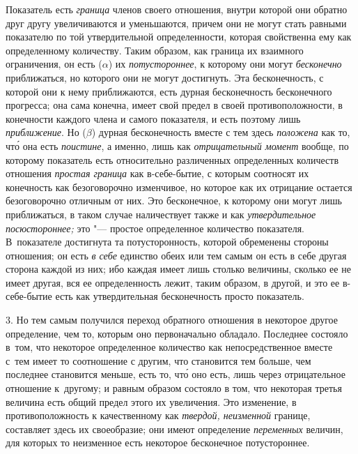 Показатель есть {\em граница} членов своего отношения, внутри которой они
обратно друг другу увеличиваются и уменьшаются, причем они не могут стать
равными показателю по той утвердительной определенности, которая свойственна
ему как определенному количеству. Таким образом, как граница их взаимного
ограничения, он есть ($\alpha$) их {\em потустороннее}, к которому они могут
{\em бесконечно} приближаться, но которого они не могут достигнуть. Эта
бесконечность, с которой они к нему приближаются, есть дурная бесконечность
бесконечного прогресса; она сама конечна, имеет свой предел в своей
противоположности, в конечности каждого члена и самого показателя, и есть
поэтому лишь {\em приближение}. Но ({\em $\beta$}) дурная бесконечность вместе
с тем здесь {\em положена} как то, чт\'{о} она есть {\em поистине}, а именно,
лишь как {\em отрицательный момент} вообще, по которому показатель есть
относительно различенных определенных количеств отношения {\em простая граница}
как в-себе-бытие, с которым соотносят их конечность как безоговорочно
изменчивое, но которое как их отрицание остается безоговорочно отличным от них.
Это бесконечное, к которому они могут лишь приближаться, в таком случае
наличествует также и как {\em утвердительное посюстороннее;} это "--- простое
определенное количество показателя. В~показателе достигнута та потусторонность,
которой обременены стороны отношения; он есть {\em в себе} единство обеих или
тем самым он есть в себе другая сторона каждой из них; ибо каждая имеет лишь
столько величины, сколько ее не имеет другая, вся ее определенность лежит,
таким образом, в другой, и это ее в-себе-бытие есть как утвердительная
бесконечность просто показатель.

3. Но тем самым получился переход обратного отношения в некоторое другое
определение, чем то, которым оно первоначально обладало. Последнее состояло
в~том, что некоторое определенное количество как непосредственное вместе с~тем
имеет то соотношение с другим, что становится тем больше, чем последнее
становится меньше, есть то, чт\'{о} оно есть, лишь через отрицательное
отношение к~другому; и равным образом состояло в том, что некоторая третья
величина есть общий предел этого их увеличения. Это изменение, в
противоположность к качественному как {\em твердой, неизменной} границе,
составляет здесь их своеобразие; они имеют определение {\em переменных}
величин, для которых то неизменное есть некоторое бесконечное потустороннее.

